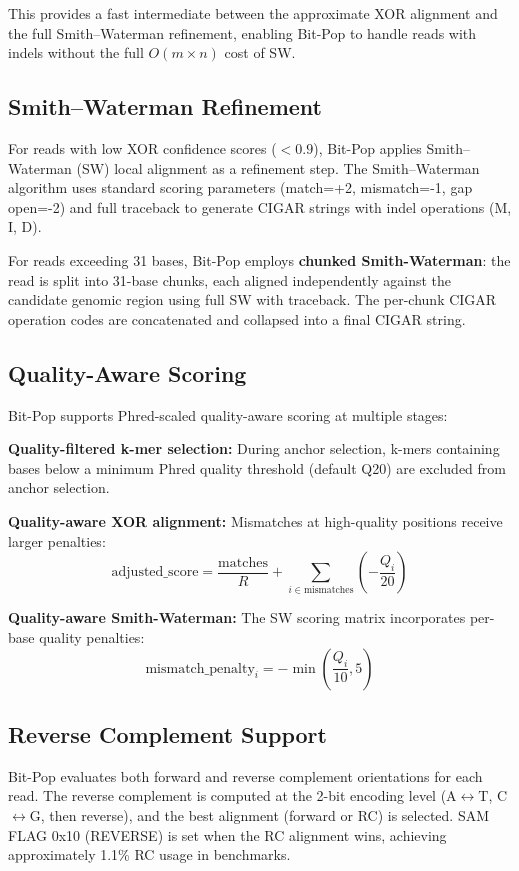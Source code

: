 \documentclass{article}
\begin{document}
This provides a fast intermediate between the approximate XOR alignment and the full Smith--Waterman refinement, enabling Bit-Pop to handle reads with indels without the full $O(m \times n)$ cost of SW.

\subsection{Smith--Waterman Refinement}

For reads with low XOR confidence scores ($< 0.9$), Bit-Pop applies Smith--Waterman (SW) local alignment as a refinement step. The Smith--Waterman algorithm \citep{smith1981} uses standard scoring parameters (match=+2, mismatch=-1, gap open=-2) and full traceback to generate CIGAR strings with indel operations (M, I, D).

For reads exceeding 31 bases, Bit-Pop employs \textbf{chunked Smith-Waterman}: the read is split into 31-base chunks, each aligned independently against the candidate genomic region using full SW with traceback. The per-chunk CIGAR operation codes are concatenated and collapsed into a final CIGAR string.

\subsection{Quality-Aware Scoring}

Bit-Pop supports Phred-scaled quality-aware scoring at multiple stages:

\textbf{Quality-filtered k-mer selection:} During anchor selection, k-mers containing bases below a minimum Phred quality threshold (default Q20) are excluded from anchor selection.

\textbf{Quality-aware XOR alignment:} Mismatches at high-quality positions receive larger penalties:
\[
\text{adjusted\_score} = \frac{\text{matches}}{R} + \sum_{i \in \text{mismatches}} \left(-\frac{Q_i}{20}\right)
\]

\textbf{Quality-aware Smith-Waterman:} The SW scoring matrix incorporates per-base quality penalties:
\[
\text{mismatch\_penalty}_i = -\min\left(\frac{Q_i}{10}, 5\right)
\]

\subsection{Reverse Complement Support}

Bit-Pop evaluates both forward and reverse complement orientations for each read. The reverse complement is computed at the 2-bit encoding level (A$\leftrightarrow$T, C$\leftrightarrow$G, then reverse), and the best alignment (forward or RC) is selected. SAM FLAG 0x10 (REVERSE) is set when the RC alignment wins, achieving approximately 1.1\% RC usage in benchmarks.
\end{document}
